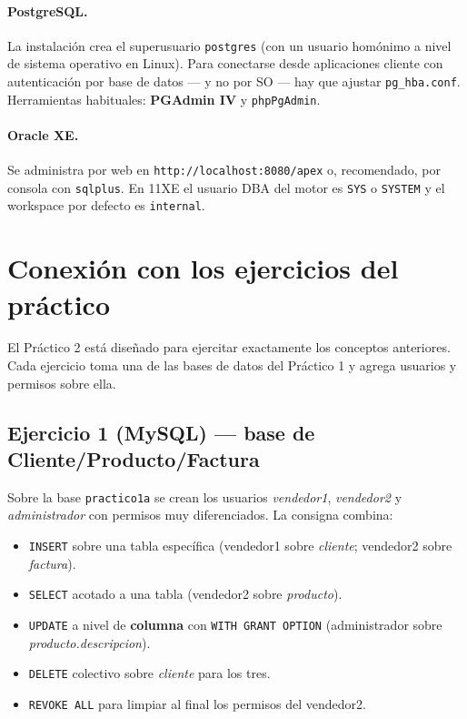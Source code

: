 \documentclass[11pt,a4paper]{article}
\begin{document}
\paragraph{PostgreSQL.} La instalación crea el superusuario
\texttt{postgres} (con un usuario homónimo a nivel de sistema
operativo en Linux). Para conectarse desde aplicaciones cliente con
autenticación por base de datos --- y no por SO --- hay que ajustar
\texttt{pg\_hba.conf}. Herramientas habituales:
\textbf{PGAdmin IV} y \texttt{phpPgAdmin}.

\paragraph{Oracle XE.} Se administra por web en
\texttt{http://localhost:8080/apex} o, recomendado, por consola con
\texttt{sqlplus}. En 11XE el usuario DBA del motor es \texttt{SYS} o
\texttt{SYSTEM} y el workspace por defecto es \texttt{internal}.

\section{Conexión con los ejercicios del práctico}

El Práctico 2 está diseñado para ejercitar exactamente los conceptos
anteriores. Cada ejercicio toma una de las bases de datos del Práctico 1
y agrega usuarios y permisos sobre ella.

\subsection*{Ejercicio 1 (MySQL) --- base de Cliente/Producto/Factura}

Sobre la base \texttt{practico1a} se crean los usuarios
\emph{vendedor1}, \emph{vendedor2} y \emph{administrador} con permisos
muy diferenciados. La consigna combina:

\begin{itemize}
    \item \texttt{INSERT} sobre una tabla específica (vendedor1 sobre
    \emph{cliente}; vendedor2 sobre \emph{factura}).
    \item \texttt{SELECT} acotado a una tabla (vendedor2 sobre
    \emph{producto}).
    \item \texttt{UPDATE} a nivel de \textbf{columna} con
    \texttt{WITH GRANT OPTION} (administrador sobre
    \emph{producto.descripcion}).
    \item \texttt{DELETE} colectivo sobre \emph{cliente} para los tres.
    \item \texttt{REVOKE ALL} para limpiar al final los permisos del
    vendedor2.
\end{itemize}
\end{document}
